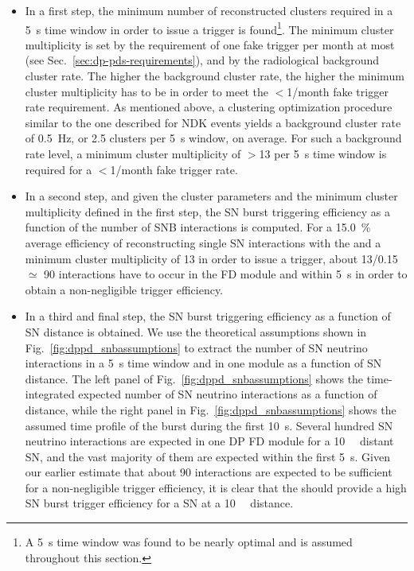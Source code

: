 \begin{itemize}
\item In a first step, the minimum number of reconstructed clusters required in a \SI{5}{\s} time window in order to issue a trigger is found\footnote{A \SI{5}{\s} time window was found to be nearly optimal and is assumed throughout this section.}. The minimum cluster multiplicity is set by the requirement of one fake trigger per month at most (see Sec.~\ref{sec:dp-pds-requirements}), and by the radiological background cluster rate. The higher the background cluster rate, the higher the minimum cluster multiplicity has to be in order to meet the $<$\num{1}/month fake trigger rate requirement. As mentioned above, a clustering optimization procedure similar to the one described for NDK events yields a background cluster rate of \SI{0.5}{\Hz}, or \num{2.5} clusters per \SI{5}{\s} window, on average. For such a background rate level, a minimum cluster multiplicity of $>$\num{13} per \SI{5}{\s} time window is required for a $<$\num{1}/month fake trigger rate.
%
\item In a second step, and given the cluster parameters and the minimum cluster multiplicity defined in the first step, the SN burst triggering efficiency as a function of the number of SNB interactions is computed. For a \SI{15.0}{\%} average efficiency of reconstructing single SN \nue interactions with the  and a minimum cluster multiplicity of \num{13} in order to issue a trigger, about \num{13}/\num{0.15}$\simeq$ \num{90} interactions have to occur in the FD module and within \SI{5}{\s} in order to obtain a non-negligible trigger efficiency. 
%
\item In a third and final step, the SN burst triggering efficiency as a function of SN distance is obtained. We use the theoretical assumptions shown in Fig.~\ref{fig:dppd_snbassumptions} to extract the number of SN neutrino interactions in a \SI{5}{\s} time window and in one   module as a function of SN distance. The left panel of Fig.~\ref{fig:dppd_snbassumptions} shows the time-integrated expected number of SN neutrino interactions as a function of distance, while the right panel in Fig.~\ref{fig:dppd_snbassumptions} shows the assumed time profile of the burst during the first \SI{10}{\s}. Several hundred SN neutrino interactions are expected in one DP FD module for a \SI{10}{\kilo\parsec} distant SN, and the vast majority of them are expected within the first \SI{5}{\s}. Given our earlier estimate that about \num{90} interactions are expected to be sufficient for a non-negligible trigger efficiency, it is clear that the  should provide a high SN burst trigger efficiency for a SN at a \SI{10}{\kilo\parsec} distance.
\end{itemize}

